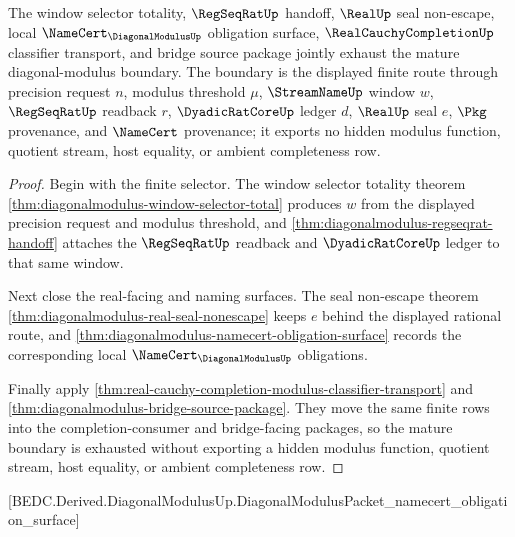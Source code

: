 \begin{theorem}
\label{thm:diagonal-modulus-mature-boundary}
The window selector totality, $\RegSeqRatUp$ handoff, $\RealUp$ seal non-escape, local $\NameCert_{\DiagonalModulusUp}$ obligation surface, $\RealCauchyCompletionUp$ classifier transport, and bridge source package jointly exhaust the mature diagonal-modulus boundary. The boundary is the displayed finite route through precision request $n$, modulus threshold $\mu$, $\StreamNameUp$ window $w$, $\RegSeqRatUp$ readback $r$, $\DyadicRatCoreUp$ ledger $d$, $\RealUp$ seal $e$, $\Pkg$ provenance, and $\NameCert$ provenance; it exports no hidden modulus function, quotient stream, host equality, or ambient completeness row.
\end{theorem}
\begin{proof}
Begin with the finite selector. The window selector totality theorem \autoref{thm:diagonalmodulus-window-selector-total} produces $w$ from the displayed precision request and modulus threshold, and \autoref{thm:diagonalmodulus-regseqrat-handoff} attaches the $\RegSeqRatUp$ readback and $\DyadicRatCoreUp$ ledger to that same window.

Next close the real-facing and naming surfaces. The seal non-escape theorem \autoref{thm:diagonalmodulus-real-seal-nonescape} keeps $e$ behind the displayed rational route, and \autoref{thm:diagonalmodulus-namecert-obligation-surface} records the corresponding local $\NameCert_{\DiagonalModulusUp}$ obligations.

Finally apply \autoref{thm:real-cauchy-completion-modulus-classifier-transport} and \autoref{thm:diagonalmodulus-bridge-source-package}. They move the same finite rows into the completion-consumer and bridge-facing packages, so the mature boundary is exhausted without exporting a hidden modulus function, quotient stream, host equality, or ambient completeness row.
\end{proof}

[BEDC.Derived.DiagonalModulusUp.DiagonalModulusPacket\_namecert\_obligation\_surface]

